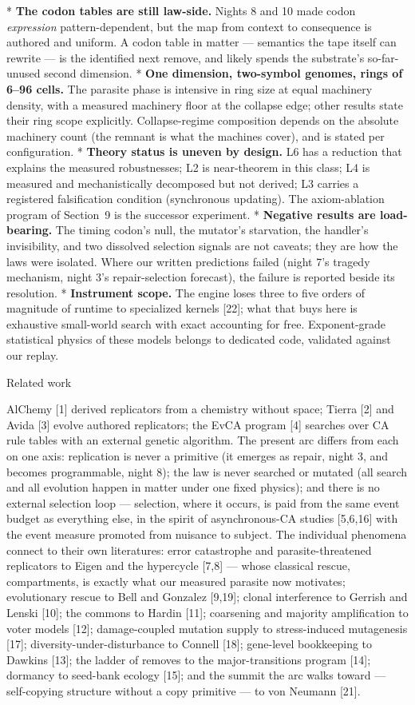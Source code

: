 \begitems
* {\bf The codon tables are still law-side.} Nights 8 and 10 made
codon {\it expression} pattern-dependent, but the map from context
to consequence is authored and uniform. A codon table in matter
--- semantics the tape itself can rewrite --- is the identified
next remove, and likely spends the substrate's so-far-unused
second dimension.
* {\bf One dimension, two-symbol genomes, rings of 6--96 cells.}
The parasite phase is intensive in ring size at equal machinery
density, with a measured machinery floor at the collapse edge;
other results state their ring scope explicitly.
Collapse-regime composition depends on the absolute machinery
count (the remnant is what the machines cover), and is stated per
configuration.
* {\bf Theory status is uneven by design.} L6 has a reduction that
explains the measured robustnesses; L2 is near-theorem in this
class; L4 is measured and mechanistically decomposed but not
derived; L3 carries a registered falsification condition
(synchronous updating). The axiom-ablation program of Section~9
is the successor experiment.
* {\bf Negative results are load-bearing.} The timing codon's
null, the mutator's starvation, the handler's invisibility, and
two dissolved selection signals are not caveats; they are how the
laws were isolated. Where our written predictions failed (night
7's tragedy mechanism, night 3's repair-selection forecast), the
failure is reported beside its resolution.
* {\bf Instrument scope.} The engine loses three to five orders of
magnitude of runtime to specialized kernels [22]; what that buys
here is exhaustive small-world search with exact accounting for
free. Exponent-grade statistical physics of these models belongs
to dedicated code, validated against our replay.
\enditems

\sec Related work

AlChemy [1] derived replicators from a chemistry without space;
Tierra [2] and Avida [3] evolve authored replicators; the EvCA
program [4] searches over CA rule tables with an external genetic
algorithm. The present arc differs from each on one axis:
replication is never a primitive (it emerges as repair, night 3,
and becomes programmable, night 8); the law is never searched or
mutated (all search and all evolution happen in matter under one
fixed physics); and there is no external selection loop ---
selection, where it occurs, is paid from the same event budget as
everything else, in the spirit of asynchronous-CA studies [5,6,16]
with the event measure promoted from nuisance to subject. The
individual phenomena connect to their own literatures: error
catastrophe and parasite-threatened replicators to Eigen and the
hypercycle [7,8] --- whose classical rescue, compartments, is
exactly what our measured parasite now motivates; evolutionary
rescue to Bell and Gonzalez [9,19]; clonal interference to Gerrish
and Lenski [10]; the commons to Hardin [11]; coarsening and
majority amplification to voter models [12]; damage-coupled
mutation supply to stress-induced mutagenesis [17];
diversity-under-disturbance to Connell [18]; gene-level
bookkeeping to Dawkins [13]; the ladder of removes to the
major-transitions program [14]; dormancy to seed-bank ecology
[15]; and the summit the arc walks toward --- self-copying
structure without a copy primitive --- to von Neumann [21].

